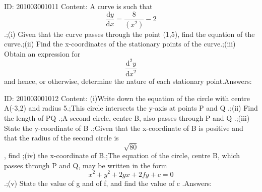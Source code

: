 \documentclass{article}
\begin{document}
ID: 201003001011
Content:
A curve is such that $$\frac{\mathrm{d} y}{\mathrm{d} x} = \frac{8}{(x^2)}-2$$.;(i) Given that the curve passes through the point (1,5), find the equation of the curve.;(ii) Find the x-coordinates of the stationary points of the curve.;(iii) Obtain an expression for $$ \frac{\mathrm{d} ^{2}y}{{\mathrm{d} x}^{2}}$$ and hence, or otherwise, determine the nature of each stationary point.Answers:

ID: 201003001012
Content:
(i)Write down the equation of the circle with centre A(-3,2) and radius 5.;This circle intersects the y-axis at points P and Q .;(ii) Find the length of PQ .;A second circle, centre B, also passes through P and Q .;(iii) State the y-coordinate of B .;Given that the x-coordinate of B is positive and that the radius of the second circle is $$\sqrt{80}$$, find ;(iv) the x-coordinate of B.;The equation of the circle, centre B, which passes through P and Q, may be written in the form $$x^2+y^2+2gx+2fy+c =0$$.;(v) State the value of g and of f, and find the value of c .Answers:
\end{document}
